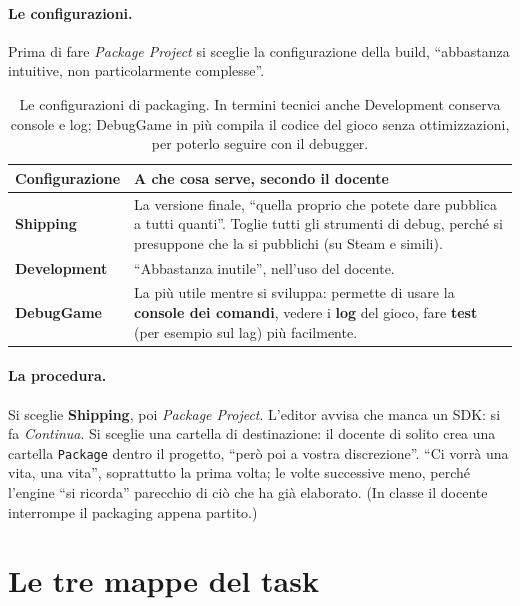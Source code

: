 \paragraph{Le configurazioni.} Prima di fare \emph{Package Project} si sceglie
la configurazione della build, ``abbastanza intuitive, non particolarmente
complesse''.

\begin{table}[htbp]
\centering
\begin{tabular}{p{2.6cm}p{10.4cm}}
\toprule
\textbf{Configurazione} & \textbf{A che cosa serve, secondo il docente} \\
\midrule
\textbf{Shipping} & La versione finale, ``quella proprio che potete dare
  pubblica a tutti quanti''. Toglie tutti gli strumenti di debug, perché si
  presuppone che la si pubblichi (su Steam e simili). \\
\textbf{Development} & ``Abbastanza inutile'', nell'uso del docente. \\
\textbf{DebugGame} & La più utile mentre si sviluppa: permette di usare la
  \textbf{console dei comandi}, vedere i \textbf{log} del gioco, fare
  \textbf{test} (per esempio sul lag) più facilmente. \\
\bottomrule
\end{tabular}
\caption{Le configurazioni di packaging. In termini tecnici anche Development
conserva console e log; DebugGame in più compila il codice del gioco senza
ottimizzazioni, per poterlo seguire con il debugger.}
\label{gd12:tab:packaging}
\end{table}

\paragraph{La procedura.} Si sceglie \textbf{Shipping}, poi \emph{Package
Project}. L'editor avvisa che manca un SDK: si fa \emph{Continua}. Si sceglie
una cartella di destinazione: il docente di solito crea una cartella
\texttt{Package} dentro il progetto, ``però poi a vostra discrezione''. ``Ci
vorrà una vita, una vita'', soprattutto la prima volta; le volte successive
meno, perché l'engine ``si ricorda'' parecchio di ciò che ha già elaborato. (In
classe il docente interrompe il packaging appena partito.)

\section{Le tre mappe del task}
\label{gd12:sec:mappe}

